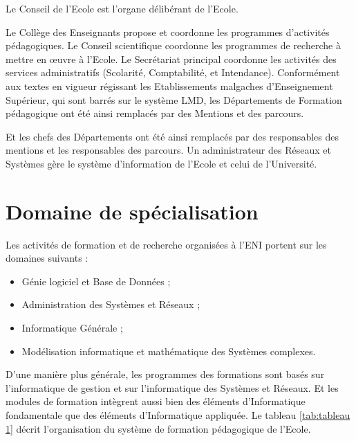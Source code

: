\documentclass[12pt]{report}
\begin{document}
				Le Conseil de l’Ecole est l’organe délibérant de l’Ecole.

				Le Collège des Enseignants propose et coordonne les programmes d’activités pédagogiques. Le Conseil scientifique coordonne les programmes de recherche à mettre en œuvre à l’Ecole. Le Secrétariat principal coordonne les activités des services administratifs (Scolarité, Comptabilité, et Intendance). Conformément aux textes en vigueur régissant les Etablissements malgaches d’Enseignement Supérieur, qui sont barrés sur le système LMD, les Départements de Formation pédagogique ont été ainsi remplacés par des Mentions et des parcours.

				Et les chefs des Départements ont été ainsi remplacés par des responsables des mentions et les responsables des parcours. Un administrateur des Réseaux et Systèmes gère le système d’information de l’Ecole et celui de l’Université.
	
				\section{Domaine de spécialisation}

				\begin{center}
					\begin{minipage}{\textwidth}
						\hspace{15pt} Les activités de formation et de recherche organisées à l’ENI portent sur les domaines suivants : 
						\begin{itemize}
							\item Génie logiciel et Base de Données ;
							\item Administration des Systèmes et Réseaux ;
							\item Informatique Générale ;
							\item Modélisation informatique et mathématique des Systèmes complexes.\\
						\end{itemize}
					\end{minipage}
				\end{center}
				D’une manière plus générale, les programmes des formations sont basés sur l’informatique de gestion et sur l’informatique des Systèmes et Réseaux. Et les modules de formation intègrent aussi bien des éléments d’Informatique fondamentale que des éléments d’Informatique appliquée. Le tableau \ref{tab:tableau 1} décrit l’organisation du système de formation pédagogique de l’Ecole.
\end{document}
